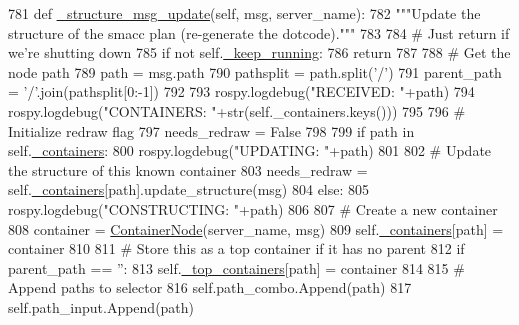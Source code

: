 \begin{DoxyCode}
781     \textcolor{keyword}{def }\hyperlink{classsmacc__viewer_1_1SmaccViewerFrame_a6109f62a87363f5254173cbb1467bcc8}{\_structure\_msg\_update}(self, msg, server\_name):
782         \textcolor{stringliteral}{"""Update the structure of the smacc plan (re-generate the dotcode)."""}
783 
784         \textcolor{comment}{# Just return if we're shutting down}
785         \textcolor{keywordflow}{if} \textcolor{keywordflow}{not} self.\hyperlink{classsmacc__viewer_1_1SmaccViewerFrame_a20aa5e983200d5e77d659780d490d285}{\_keep\_running}:
786             \textcolor{keywordflow}{return}
787 
788         \textcolor{comment}{# Get the node path}
789         path = msg.path
790         pathsplit = path.split(\textcolor{stringliteral}{'/'})
791         parent\_path = \textcolor{stringliteral}{'/'}.join(pathsplit[0:-1])
792 
793         rospy.logdebug(\textcolor{stringliteral}{"RECEIVED: "}+path)
794         rospy.logdebug(\textcolor{stringliteral}{"CONTAINERS: "}+str(self.\_containers.keys()))
795 
796         \textcolor{comment}{# Initialize redraw flag}
797         needs\_redraw = \textcolor{keyword}{False}
798 
799         \textcolor{keywordflow}{if} path \textcolor{keywordflow}{in} self.\hyperlink{classsmacc__viewer_1_1SmaccViewerFrame_a00ea07c6cc068340230dcac273ad5e90}{\_containers}:
800             rospy.logdebug(\textcolor{stringliteral}{"UPDATING: "}+path)
801 
802             \textcolor{comment}{# Update the structure of this known container}
803             needs\_redraw = self.\hyperlink{classsmacc__viewer_1_1SmaccViewerFrame_a00ea07c6cc068340230dcac273ad5e90}{\_containers}[path].update\_structure(msg)
804         \textcolor{keywordflow}{else}: 
805             rospy.logdebug(\textcolor{stringliteral}{"CONSTRUCTING: "}+path)
806 
807             \textcolor{comment}{# Create a new container}
808             container = \hyperlink{classsmacc__viewer_1_1ContainerNode}{ContainerNode}(server\_name, msg)
809             self.\hyperlink{classsmacc__viewer_1_1SmaccViewerFrame_a00ea07c6cc068340230dcac273ad5e90}{\_containers}[path] = container
810 
811             \textcolor{comment}{# Store this as a top container if it has no parent}
812             \textcolor{keywordflow}{if} parent\_path == \textcolor{stringliteral}{''}:
813                 self.\hyperlink{classsmacc__viewer_1_1SmaccViewerFrame_acc2f4310b3de2703026548d0d18387ea}{\_top\_containers}[path] = container
814 
815             \textcolor{comment}{# Append paths to selector}
816             self.path\_combo.Append(path)
817             self.path\_input.Append(path)

\end{DoxyCode}
